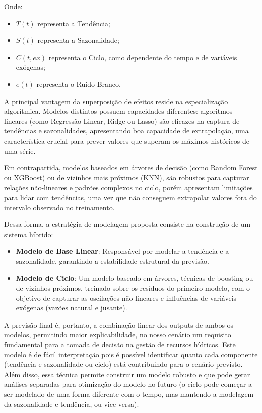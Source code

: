 Onde: 

\begin{itemize}
\item $T(t)$ representa a Tendência; 
\item $S(t)$ representa a Sazonalidade; 
\item $C(t, ex)$ representa o Ciclo, como dependente do tempo e de variáveis exógenas; 
\item $e(t)$ representa o Ruído Branco.
\end{itemize}

A principal vantagem da superposição de efeitos reside na especialização algorítmica. Modelos distintos possuem capacidades diferentes: algoritmos lineares (como Regressão Linear, Ridge ou Lasso) são eficazes na captura de tendências e sazonalidades, apresentando boa capacidade de extrapolação, uma característica crucial para prever valores que superam os máximos históricos de uma série. 

Em contrapartida, modelos baseados em árvores de decisão (como Random Forest ou XGBoost) ou de vizinhos mais próximos (\acrshort{KNN}), são robustos para capturar relações não-lineares e padrões complexos no ciclo, porém apresentam limitações para lidar com tendências, uma vez que não conseguem extrapolar valores fora do intervalo observado no treinamento. 

Dessa forma, a estratégia de modelagem proposta consiste na construção de um sistema híbrido: 

\begin{itemize}
\item \textbf{Modelo de Base Linear}: Responsável por modelar a tendência e a sazonalidade, garantindo a estabilidade estrutural da previsão. 
\item \textbf{Modelo de Ciclo}: Um modelo baseado em árvores, técnicas de boosting ou de vizinhos próximos, treinado sobre os resíduos do primeiro modelo, com o objetivo de capturar as oscilações não lineares e influências de variáveis exógenas (vazões natural e jusante).
\end{itemize}

A previsão final é, portanto, a combinação linear dos outputs de ambos os modelos, permitindo maior explicabilidade, no nosso cenário um requisito fundamental para a tomada de decisão na gestão de recursos hídricos. Este modelo é de fácil interpretação pois é possível identificar quanto cada componente (tendência e sazonalidade ou ciclo) está contribuindo para o cenário previsto. Além disso, essa técnica permite construir um modelo robusto e que pode gerar análises separadas para otimização do modelo no futuro (o ciclo pode começar a ser modelado de uma forma diferente com o tempo, mas mantendo a modelagem da sazonalidade e tendência, ou vice-versa). 

